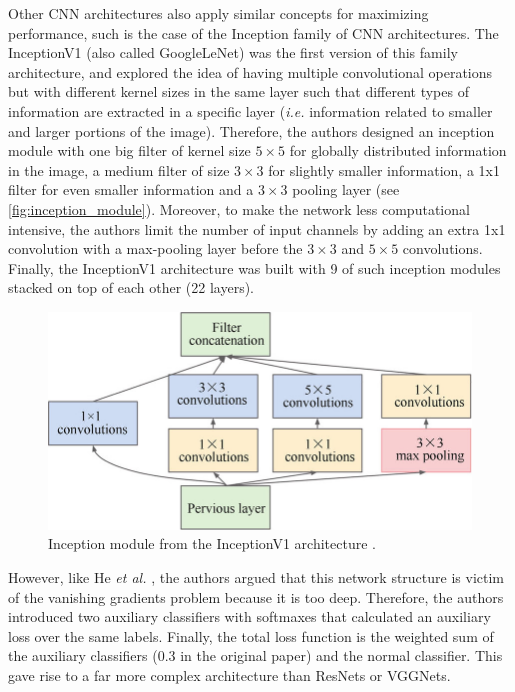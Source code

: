     Other \ac{CNN} architectures also apply similar concepts for maximizing performance, such is the case of the Inception family of \ac{CNN} architectures. The InceptionV1 \cite{inceptionv1} (also called GoogleLeNet) was the first version of this family architecture, and explored the idea of having multiple convolutional operations but with different kernel sizes in the same layer such that different types of information are extracted in a specific layer (\textit{i.e.} information related to smaller and larger portions of the image). Therefore, the authors designed an inception module with one big filter of kernel size $5 \times 5$ for globally distributed information in the image, a medium filter of size $3 \times 3$ for slightly smaller information, a 1x1 filter for even smaller information and a $3 \times 3$ pooling layer (see \autoref{fig:inception_module}). Moreover, to make the network less computational intensive, the authors limit the number of input channels by adding an extra 1x1 convolution with a max-pooling layer before the $3 \times 3$ and $5 \times 5$ convolutions. Finally, the InceptionV1 architecture was built with 9 of such inception modules stacked on top of each other (22 layers). \par
    
    \begin{figure}[ht]
      \centering
        \includegraphics[width=0.6\linewidth]{figs/inception_module.png}
      \caption{Inception module from the InceptionV1 architecture \cite{inceptionv1}.}
      \label{fig:inception_module}
    \end{figure}
    
    However, like He \textit{et al.} \cite{resnet}, the authors argued that this network structure is victim of the vanishing gradients problem because it is too deep. Therefore, the authors introduced two auxiliary classifiers with softmaxes that calculated an auxiliary loss over the same labels. Finally, the total loss function is the weighted sum of the auxiliary classifiers (0.3 in the original paper) and the normal classifier. This gave rise to a far more complex architecture than ResNets or VGGNets. \par
    

